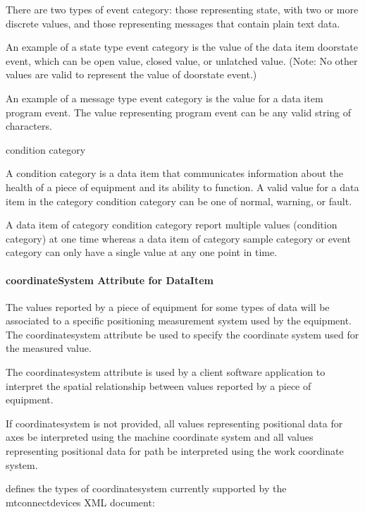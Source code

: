\documentclass{mtconnect}	%
\begin{document}
There are two types of \gls{event category}: those representing state, with two or more discrete values, and those representing messages that contain plain text data.

An example of a state type \gls{event category} is the value of the data item \gls{doorstate event}, which can be \gls{open value}, \gls{closed value}, or \gls{unlatched value}.   (Note:  No other values are valid to represent the value of \gls{doorstate event}.)

An example of a message type \gls{event category} is the value for a data item \gls{program event}.  The value representing \gls{program event} can be any valid string of characters.

\gls{condition category}

\tab A \gls{condition category} is a data item that communicates information about the health of a piece of equipment and its ability to function.  A valid value for a data item in the category \gls{condition category} can be one of \gls{normal}, \gls{warning}, or \gls{fault}.

A data item of category \gls{condition category} \may report multiple values (\gls{condition category}) at one time whereas a data item of category \gls{sample category} or \gls{event category} can only have a single value at any one point in time.

\paragraph{coordinateSystem Attribute for DataItem}\mbox{}

The values reported by a piece of equipment for some types of data will be associated to a specific positioning measurement system used by the equipment.  The \gls{coordinatesystem} attribute \may be used to specify the coordinate system used for the measured value.

The \gls{coordinatesystem} attribute is used by a client software application to interpret the spatial relationship between values reported by a piece of equipment.

If \gls{coordinatesystem} is not provided, all values representing positional data for \gls{axes} \must be interpreted using the \gls{machine} coordinate system and all values representing positional data for \gls{path} \must be interpreted using the \gls{work} coordinate system.

 defines the types of \gls{coordinatesystem} currently supported by the \gls{mtconnectdevices} XML document:
\end{document}
